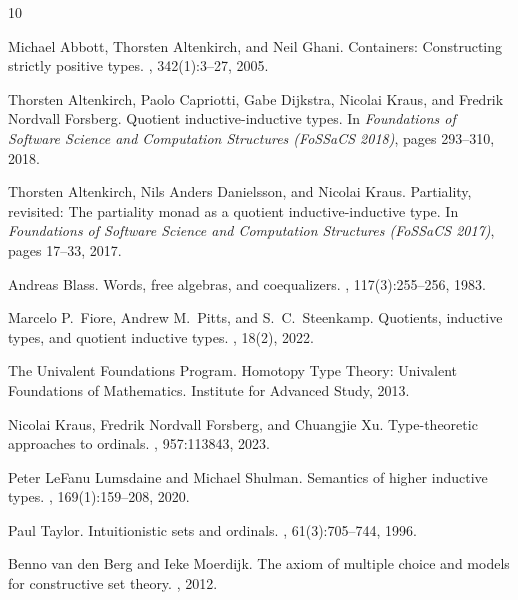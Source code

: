 \documentclass{easychair}
\begin{document}
\begin{thebibliography}{10}

Michael Abbott, Thorsten Altenkirch, and Neil Ghani.
\newblock Containers: Constructing strictly positive types.
, 342(1):3--27, 2005.

Thorsten Altenkirch, Paolo Capriotti, Gabe Dijkstra, Nicolai Kraus, and
Fredrik Nordvall Forsberg.
\newblock Quotient inductive-inductive types.
\newblock In {\em Foundations of Software Science and Computation Structures
  (FoSSaCS 2018)}, pages 293--310, 2018.

Thorsten Altenkirch, Nils Anders Danielsson, and Nicolai Kraus.
\newblock Partiality, revisited: The partiality monad as a quotient
  inductive-inductive type.
\newblock In {\em Foundations of Software Science and Computation Structures
  (FoSSaCS 2017)}, pages 17--33, 2017.

Andreas Blass.
\newblock Words, free algebras, and coequalizers.
, 117(3):255--256, 1983.

Marcelo P.~Fiore, Andrew M.~Pitts, and S.~C.~Steenkamp.
\newblock Quotients, inductive types, and quotient inductive types.
, 18(2), 2022.

The Univalent Foundations Program.
\newblock Homotopy Type Theory: Univalent Foundations of Mathematics.
\newblock Institute for Advanced Study, 2013.

Nicolai Kraus, Fredrik Nordvall Forsberg, and Chuangjie Xu.
\newblock Type-theoretic approaches to ordinals.
, 957:113843, 2023.

Peter LeFanu Lumsdaine and Michael Shulman.
\newblock Semantics of higher inductive types.
, 169(1):159--208, 2020.

Paul Taylor.
\newblock Intuitionistic sets and ordinals.
, 61(3):705--744, 1996.

Benno van den Berg and Ieke Moerdijk.
\newblock The axiom of multiple choice and models for constructive set theory.
, 2012.

\end{thebibliography}
\end{document}
